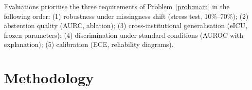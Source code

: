 \documentclass[a4paper,fleqn,longmktitle]{cas-sc}
\begin{document}
	Evaluations prioritise the three requirements of
	Problem~\ref{prob:main} in the following order:
	(1) robustness under missingness shift (stress test, 10\%--70\%);
	(2) abstention quality (AURC, ablation);
	(3) cross-institutional generalisation (eICU, frozen parameters);
	(4) discrimination under standard conditions (AUROC with explanation);
	(5) calibration (ECE, reliability diagrams).
	
	
	
	\section{Methodology}
	\label{sec:methodology}
	
\end{document}
